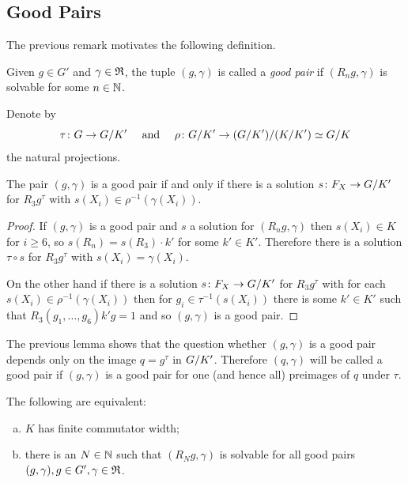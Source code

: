 \documentclass[a4paper,11pt]{amsart}
\begin{document}
\subsection{Good Pairs}\label{sec:good_pairs}
The previous remark motivates the following definition.
\begin{defi}
Given $g\in G'$ and $\gamma\in\mathfrak{R}$, the tuple $(g,\gamma)$ is called a \emph{good pair} if 
$(R_ng,\gamma)$ is solvable for some $n\in\mathbb{N}$.  
\end{defi}

\begin{lem}
 Denote by 
 \[\tau\colon G\to{G/K'}\quad\text{ and }\quad\rho\colon {G/K'} \to {({G/K'})/({K/K'})}\simeq {G/K}\]
 the natural projections.
 
 The pair $(g,\gamma)$ is a good pair if and only if there is a solution $s\colon F_X \to {G/K'}$ for $R_3g^\tau$ with $s(X_i) \in \rho^{-1}(\gamma(X_i))$. 
\end{lem}
\begin{proof}
 If $(g,\gamma)$ is a good pair and $s$ a solution for $(R_ng,\gamma)$ 
 then $s(X_i)\in K$ for $i\geq6$, so $s(R_n) = s(R_3) \cdot k'$ for some $k'\in K'$. 
 Therefore there is a solution $\tau\circ s$ for $R_3g^\tau$ with $s(X_i) = \gamma(X_i)$.
 
 On the other hand if there is a solution $s\colon F_X \to {G/K'}$ for $R_3g^\tau$ with for each $s(X_i) \in \rho^{-1}(\gamma(X_i))$ then
 for $g_i \in \tau^{-1}(s(X_i))$ there is some $k'\in K'$ such that $R_3(g_1,\ldots,g_6)k'g=1$ and so $(g,\gamma)$ is a good pair.
\end{proof}
The previous lemma shows that the question whether $(g,\gamma)$ is a good pair depends only on the image $q=g^\tau$ in ${G/K'}$. Therefore
$(q,\gamma)$ will be called a good pair if $(g,\gamma)$ is a good pair for one (and hence all) preimages of $q$ under $\tau$.
\begin{cor}\label{cor:finiteCommutatorWidthKimpliesBoundedConstraintedCommutators}
The following are equivalent:
\begin{enumerate}[(a)]
 \item $K$ has finite commutator width; \label{Cor:EqStatement1}
 \item there is an $N\in\mathbb{N}$ such that $(R_Ng,\gamma)$ is solvable 
 for all good pairs $(g,\gamma),g \in G',\gamma\in\mathfrak{R}$.
 \label{Cor:EqStatement2}
\end{enumerate} 
\end{cor}
\end{document}
